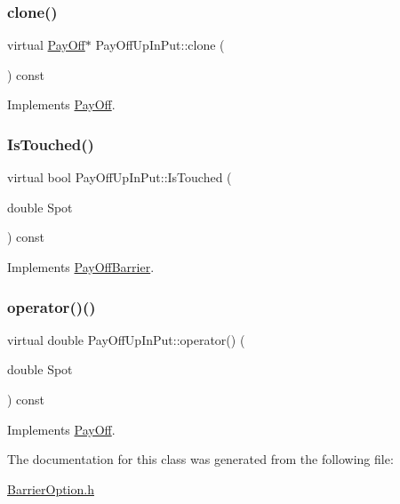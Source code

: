 \subsubsection{\texorpdfstring{clone()}{clone()}}
{\footnotesize\ttfamily virtual \hyperlink{classPayOff}{Pay\+Off}$\ast$ Pay\+Off\+Up\+In\+Put\+::clone (\begin{DoxyParamCaption}{ }\end{DoxyParamCaption}) const\hspace{0.3cm}{\ttfamily [virtual]}}



Implements \hyperlink{classPayOff_ad8194d5b82247ae89c25c515f0ba806a}{Pay\+Off}.

\hypertarget{classPayOffUpInPut_a8e8079a2508dfc533f60ca52b496f603}{}\label{classPayOffUpInPut_a8e8079a2508dfc533f60ca52b496f603} 
\subsubsection{\texorpdfstring{Is\+Touched()}{IsTouched()}}
{\footnotesize\ttfamily virtual bool Pay\+Off\+Up\+In\+Put\+::\+Is\+Touched (\begin{DoxyParamCaption}\item[{double}]{Spot }\end{DoxyParamCaption}) const\hspace{0.3cm}{\ttfamily [virtual]}}



Implements \hyperlink{classPayOffBarrier_a2aa9162c618c4f72a6593dc625e1e1e8}{Pay\+Off\+Barrier}.

\hypertarget{classPayOffUpInPut_ad5173b4e12554d96780b4c6d10818daf}{}\label{classPayOffUpInPut_ad5173b4e12554d96780b4c6d10818daf} 
\subsubsection{\texorpdfstring{operator()()}{operator()()}}
{\footnotesize\ttfamily virtual double Pay\+Off\+Up\+In\+Put\+::operator() (\begin{DoxyParamCaption}\item[{double}]{Spot }\end{DoxyParamCaption}) const\hspace{0.3cm}{\ttfamily [virtual]}}



Implements \hyperlink{classPayOff_a5ae17d82c233ef5568c8fb0539703000}{Pay\+Off}.



The documentation for this class was generated from the following file\+:\begin{DoxyCompactItemize}
\item 
\hyperlink{BarrierOption_8h}{Barrier\+Option.\+h}\end{DoxyCompactItemize}
